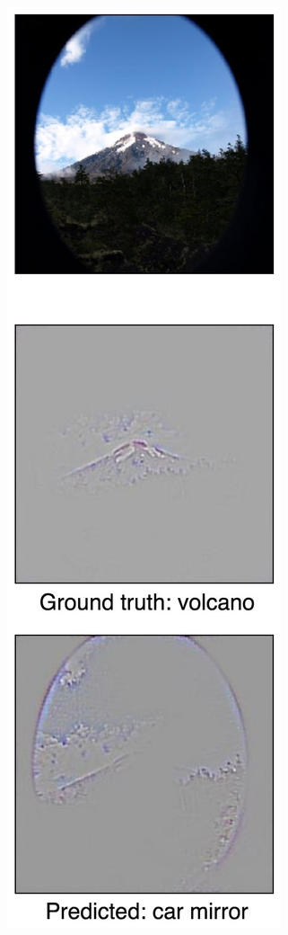 \begin{figure}[ht!]
\begin{center}
\begin{subfigure}[b]{0.23\linewidth}
        \caption{}
        \label{fig:failure_volcano}
    \end{subfigure}
    ~
    \begin{subfigure}[b]{0.23\linewidth}
        \centering
        \includegraphics[width=1\linewidth]{figures/failure_11.jpg}

\end{subfigure}
\end{center}
\end{figure}
